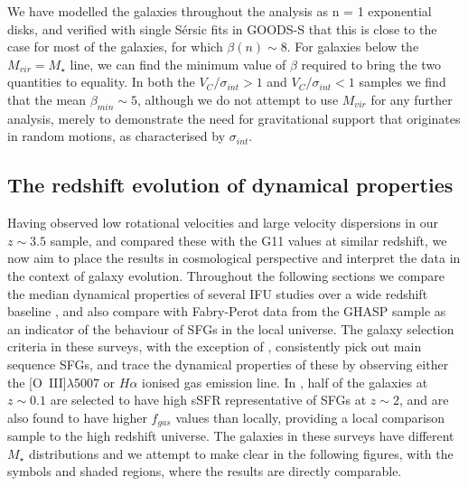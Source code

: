 \documentclass[fleqn,usenatbib]{mn2e}
\newcommand{\Sers}{S\'{e}rsic }
\begin{document}

We have modelled the galaxies throughout the analysis as n = 1 exponential disks, and verified with single \Sers fits in GOODS-S that this is close to the case for most of the galaxies, for which $\beta(n) \sim 8$.
For galaxies below the $M_{vir} = M_{\star}$ line, we can find the minimum value of $\beta$ required to bring the two quantities to equality.
In both the $V_{C}/\sigma_{int} > 1$ and $V_{C}/\sigma_{int} < 1$ samples we find that the mean $\beta_{min}\sim 5$, although we do not attempt to use $M_{vir}$ for any further analysis, merely to demonstrate the need for gravitational support that originates in random motions, as characterised by $\sigma_{int}$.
 
\subsection{The redshift evolution of dynamical properties}\label{subsec:redshift_evolution}
Having observed low rotational velocities and large velocity dispersions in our $z \sim 3.5$ sample, and compared these with the G11 values at similar redshift, we now aim to place the results in cosmological perspective and interpret the data in the context of galaxy evolution.
Throughout the following sections we compare the median dynamical properties of several IFU studies over a wide redshift baseline \citep{Green2014,Wisnioski2015,Epinat2012,ForsterSchreiber2009,Cresci2009,Gnerucci2011}, and also compare with Fabry-Perot data from the GHASP sample \citep{Epinat2008,Epinat2008a} as an indicator of the behaviour of SFGs in the local universe.
The galaxy selection criteria in these surveys, with the exception of \cite{Green2014}, consistently pick out main sequence SFGs, and trace the dynamical properties of these by observing either the [O~{\sc III}]$\lambda$5007 or $H\alpha$ ionised gas emission line.
In \cite{Green2014}, half of the galaxies at $z\sim 0.1$ are selected to have high sSFR representative of SFGs at $z\sim 2$, and are also found to have higher $f_{gas}$ values than locally, providing a local comparison sample to the high redshift universe. 
The galaxies in these surveys have different $M_{\star}$ distributions and we attempt to make clear in the following figures, with the symbols and shaded regions, where the results are directly comparable. 
\end{document}
